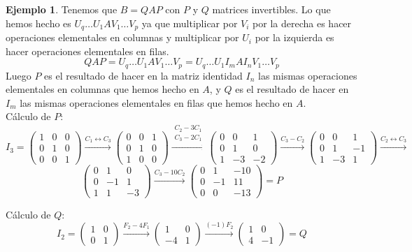 \documentclass{article}
\theoremstyle{theorem-style}  %
\theoremstyle{definition}
\theoremstyle{example-style}
\newtheorem{example}{Ejemplo}[section]
\begin{document}
\begin{example}
	Tenemos que $B=QAP$ con $P$ y $Q$ matrices invertibles. Lo que hemos hecho es $U_q\dots U_1AV_1\dots V_p$ ya que multiplicar por $V_i$ por la derecha es hacer operaciones elementales en columnas y multiplicar por $U_i$ por la izquierda es hacer operaciones elementales en filas.
	\[ QAP=U_q\dots U_1AV_1\dots V_p=U_q\dots U_1I_mAI_nV_1\dots V_p\]
	Luego $P$ es el resultado de hacer en la matriz identidad $I_n$ las mismas operaciones elementales en columnas que hemos hecho en $A$, y $Q$ es el resultado de hacer en $I_m$ las mismas operaciones elementales en filas que hemos hecho en $A$.\\
	Cálculo de $P$:
	\[ I_3 = \begin{pmatrix}
			1 & 0 & 0 \\
			0 & 1 & 0 \\
			0 & 0 & 1
			\end{pmatrix}\xrightarrow{C_1\leftrightarrow C_3}\begin{pmatrix}
			0 & 0 & 1 \\
			0 & 1 & 0 \\
			1 & 0 & 0
			\end{pmatrix}\xrightarrow{\substack{C_2-3C_1\\C_3-2C_1}}\begin{pmatrix}
			0 & 0 & 1 \\
			0 & 1 & 0 \\
			1 & -3 & -2
			\end{pmatrix}\xrightarrow{C_3-C_2}\begin{pmatrix}
			0 & 0 & 1 \\
			0 & 1 & -1 \\
			1 & -3 & 1
			\end{pmatrix}\xrightarrow{C_2\leftrightarrow C_3}\] 
			\[\begin{pmatrix}
			0 & 1 & 0 \\
			0 & -1 & 1 \\
			1 & 1 & -3
			\end{pmatrix}\xrightarrow{C_3-10C_2}\begin{pmatrix}
			0 & 1 & -10 \\
			0 & -1 & 11 \\
			0 & 0 & -13
	\end{pmatrix}=P \]

	Cálculo de $Q$:
	\[I_2= \begin{pmatrix}
			1 & 0\\
			0 & 1
			\end{pmatrix}\xrightarrow{F_2-4F_1}\begin{pmatrix}
			1 & 0\\
			-4 & 1
			\end{pmatrix}\xrightarrow{(-1)F_2}\begin{pmatrix}
			1 & 0\\
			4 & -1
	\end{pmatrix}=Q\]

	\end{example}
	
\end{document}
